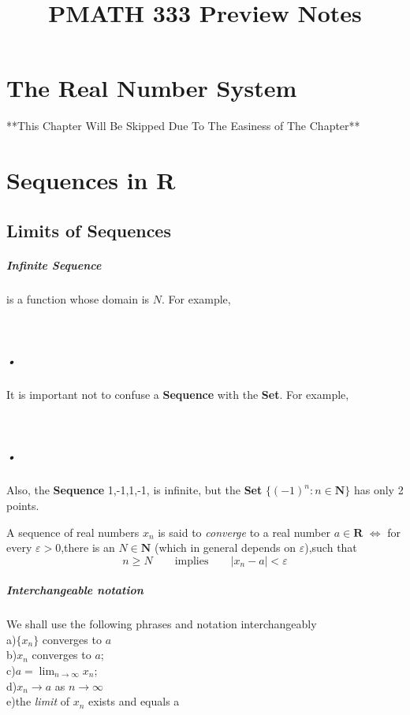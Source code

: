 \documentclass{report}
\title{PMATH 333 Preview Notes}
\begin{document}
\maketitle
\tableofcontents
\chapter{The Real Number System}
**This Chapter Will Be Skipped Due To The Easiness of The Chapter**
\chapter{Sequences in R}
\section{Limits of Sequences}
\paragraph{Infinite Sequence}is a function whose domain is $N$. For example,\\\\\\
\paragraph{•} It is important not to confuse a \textbf{Sequence} with the \textbf{Set}. For example,\\\\ \\
\paragraph{•} Also, the \textbf{Sequence} 1,-1,1,-1, is infinite, but the \textbf{Set} $\{{(-1)^n : n\in\mathbf N}
\}$ has only 2 points.


\begin{defbox}
A sequence of real numbers {$x_n$} is said to \emph{converge} to a real number $a\in \mathbf R$ $\iff$ for every $\varepsilon > 0$,there is an $ N\in \mathbf N$ (which in general depends on $\varepsilon$),such that
$$ n\ge N \qquad \text{implies} \qquad |x_n-a| < \varepsilon$$
\end{defbox}
\paragraph{Interchangeable notation} We shall use the following phrases and notation interchangeably\\
a)$\{x_n\}$ converges to $a$\\
b)$x_n$ converges to $a$;\\
c)$a = \lim_{n\to\infty} x_n$;\\
d)$x_n\to a$ as $n\to \infty$\\
e)the \emph{limit}  of {$x_n$} exists and equals a\\ 
\end{document}
